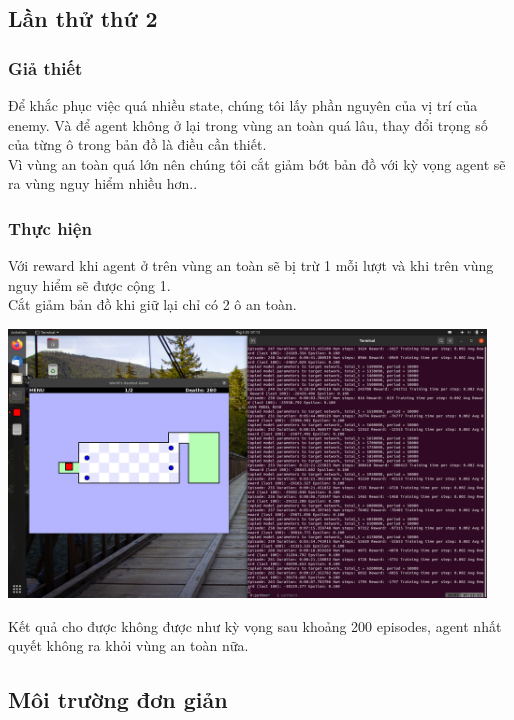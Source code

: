 \documentclass[12pt,a4paper]{article}
\begin{document}
\subsection{Lần thử thứ 2}
\subsubsection{Giả thiết}
Để khắc phục việc quá nhiều state, chúng tôi lấy phần nguyên của vị trí của enemy. Và để agent không ở lại trong vùng an toàn quá lâu, thay đổi trọng số của từng ô trong bản đồ là điều cần thiết.\\
Vì vùng an toàn quá lớn nên chúng tôi cắt giảm bớt bản đồ với kỳ vọng agent sẽ ra vùng nguy hiểm nhiều hơn..
\subsubsection{Thực hiện}
Với reward khi agent ở trên vùng an toàn sẽ bị trừ 1 mỗi lượt và khi trên vùng nguy hiểm sẽ được cộng 1.\\
Cắt giảm bản đồ khi giữ lại chỉ có 2 ô an toàn.\\
\begin{center}
\includegraphics[width=0.95\textwidth]{Thesis_image/try2.png}\\    
\end{center}
Kết quả cho được không được như kỳ vọng sau khoảng 200 episodes, agent nhất quyết không ra khỏi vùng an toàn nữa.
\subsection{Môi trường đơn giản}
\end{document}
